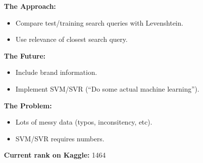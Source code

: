 \documentclass[10pt,handout]{beamer}
\begin{document}
	
	\begin{frame}
	    \begin{alertblock}{\textbf{The Approach:}}
	    \begin{itemize}
	        \item Compare test/training search queries with Levenshtein.
	        \item Use relevance of closest search query.
	    \end{itemize}
	    \end{alertblock}
	    
	    \begin{alertblock}{\textbf{The Future:}}
	    \begin{itemize}
	        \item Include brand information.
	        \item Implement SVM/SVR (``Do some actual machine learning'').
	    \end{itemize}
	    \end{alertblock}

       \begin{alertblock}{\textbf{The Problem:}}
	    \begin{itemize}
	        \item Lots of messy data (typos, inconsitency, etc).
	        \item SVM/SVR requires numbers.
	    \end{itemize}
	    \end{alertblock}
	    
	    \vspace{-0.3cm}
	    
	    \begin{alertblock}{\vspace*{-3ex}}
	    	\textbf{\textcolor{reddy}{Current rank on Kaggle:}} 1464
	    \end{alertblock}
	    
	\end{frame}
	
	
\end{document}
